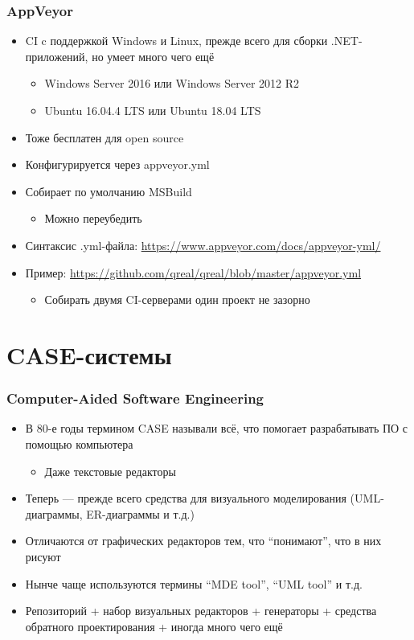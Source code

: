 \documentclass[xetex,mathserif,serif]{beamer}
\begin{document}
	\begin{frame}
		\frametitle{AppVeyor}
		\begin{itemize}
			\item CI c поддержкой Windows и Linux, прежде всего для сборки .NET-приложений, но умеет много чего ещё
			\begin{itemize}
				\item Windows Server 2016 или Windows Server 2012 R2
				\item Ubuntu 16.04.4 LTS или Ubuntu 18.04 LTS
			\end{itemize}
			\item Тоже бесплатен для open source
			\item Конфигурируется через appveyor.yml
			\item Собирает по умолчанию MSBuild
			\begin{itemize}
				\item Можно переубедить
			\end{itemize}
			\item Синтаксис .yml-файла: \url{https://www.appveyor.com/docs/appveyor-yml/}
			\item Пример: \url{https://github.com/qreal/qreal/blob/master/appveyor.yml}
			\begin{itemize}
				\item Собирать двумя CI-серверами один проект не зазорно
			\end{itemize}
		\end{itemize}
	\end{frame}

	\section{CASE-системы}

	\begin{frame}
		\frametitle{Computer-Aided Software Engineering}
		\begin{itemize}
			\item В 80-е годы термином CASE называли всё, что помогает разрабатывать ПО с помощью компьютера
			\begin{itemize}
				\item Даже текстовые редакторы
			\end{itemize}
			\item Теперь --- прежде всего средства для визуального моделирования (UML-диаграммы, ER-диаграммы и т.д.)
			\item Отличаются от графических редакторов тем, что ``понимают'', что в них рисуют
			\item Нынче чаще используются термины ``MDE tool'', ``UML tool'' и т.д.
			\item Репозиторий + набор визуальных редакторов + генераторы + средства обратного проектирования + иногда много чего ещё
		\end{itemize}
	\end{frame}
\end{document}
